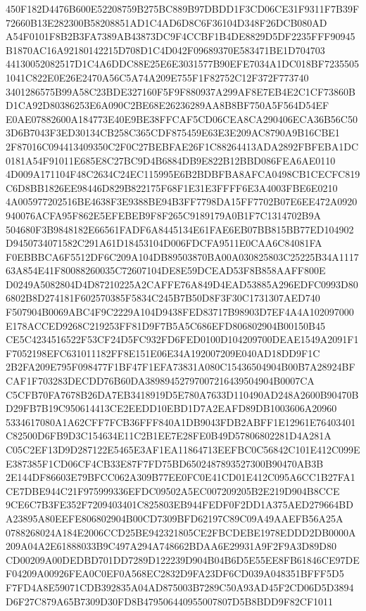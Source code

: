 \documentclass[UTF8,fontset=fandol,zihao=-4,a4paper]{ctexart}
\begin{document}
{{450F182D4476B600E52208759B275BC889B97DBDD1F3CD06CE31F9311F7B39F72660B13E282300B58208851AD1C4AD6D8C6F36104D348F26DCB080AD
A54F0101F8B2B3FA7389AB43873DC9F4CCBF1B4DE8829D5DF2235FFF90945B1870AC16A92180142215D708D1C4D042F09689370E583471BE1D704703
44130052082517D1C4A6DDC88E25E6E3031577B90EFE7034A1DC018BF72355051041C822E0E26E2470A56C5A74A209E755F1F82752C12F372F773740
3401286575B99A58C23BDE327160F5F9F880937A299AF8E7EB4E2C1CF73860BD1CA92D80386253E6A090C2BE68E26236289AA8B8BF750A5F564D54EF
E0AE07882600A184773E40E9BE38FFCAF5CD06CEA8CA290406ECA36B56C503D6B7043F3ED30134CB258C365CDF875459E63E3E209AC8790A9B16CBE1
2F87016C094413409350C2F0C27BEBFAE26F1C88264413ADA2892FBFEBA1DC0181A54F91011E685E8C27BC9D4B6884DB9E822B12BBD086FEA6AE0110
4D009A171104F48C2634C24EC115995E6B2BDBFBA8AFCA0498CB1CECFC819C6D8BB1826EE98446D829B822175F68F1E31E3FFFF6E3A4003FBE6E0210
4A005977202516BE4638F3E9388BE94B3FF7798DA15FF7702B07E6EE472A0920940076ACFA95F862E5EFEBEB9F8F265C9189179A0B1F7C1314702B9A
504680F3B9848182E66561FADF6A8445134E61FAE6EB07BB815BB77ED104902D9450734071582C291A61D18453104D006FDCFA9511E0CAA6C84081FA
F0EBBBCA6F5512DF6C209A104DB89503870BA00A030825803C25225B34A111763A854E41F80088260035C72607104DE8E59DCEAD53F8B858AAFF800E
D0249A5082804D4D87210225A2CAFFE76A849D4EAD53885A296EDFC0993D806802B8D274181F602570385F5834C245B7B50D8F3F30C1731307AED740
F507904B0069ABC4F9C2229A104D9438FED83717B98903D7EF4A4A102097000E178ACCED9268C219253FF81D9F7B5A5C686EFD806802904B00150B45
CE5C4234516522F53CF24D5FC932FD6FED0100D104209700DEAE1549A2091F1F7052198EFC631011182FF8E151E06E34A192007209E040AD18DD9F1C
2B2FA209E795F098477F1BF47F1EFA73831A080C15436504904B00B7A28924BFCAF1F703283DECDD76B60DA38989452797007216439504904B0007CA
C5CFB70FA7678B26DA7EB3418919D5E780A7633D110490AD248A2600B90470BD29FB7B19C950614413CE2EEDD10EBD1D7A2EAFD89DB1003606A20960
5334617080A1A62CFF7FCB36FFF840A1DB9043FDB2ABFF1E12961E76403401C82500D6FB9D3C154634E11C2B1EE7E28FE0B49D57806802281D4A281A
C05C2EF13D9D287122E5465E3AF1EA11864713EEFBC0C56842C101E412C099EE387385F1CD06CF4CB33E87F7FD75BD6502487893527300B90470AB3B
2E144DF86603E79BFCC062A309B77EE0FC0E41CD01E412C095A6CC1B27FA1CE7DBE944C21F975999336EFDC09502A5EC007209205B2E219D904B8CCE
9CE6C7B3FE352F7209403401C825803EB944FEDF0F2DD1A375AED279664BDA23895A80EEFE806802904B00CD7309BFD62197C89C09A49AAEFB56A25A
0788268024A184E2006CCD25BE942321805CE2FBCDEBE1978EDDD2DB0000A209A04A2E61888033B9C497A294A748662BDAA6E29931A9F2F9A3D89D80
CD00209A00DEDBD701DD7289D122239D904B04B6D5E55EE8FB61846CE97DEF04209A00926FEA0C0EF0A568EC2832D9FA23DF6CD039A048351BFFF5D5
F7FD4A8E59071CDB392835A04AD875003B7289C50A93AD45F2CD06D5D3894D6F27C879A65B7309D30FD8B479506440955007807D5B8BDD9F82CF1011
}}
\end{document}
